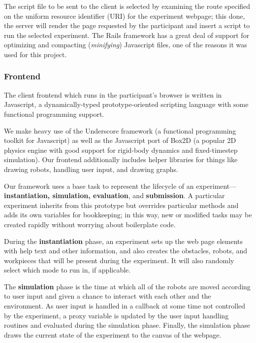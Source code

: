 The script file to be sent to the client is selected by examining the route specified on the  uniform resource identifier (URI) for the experiment webpage; this done, the server will render the page requested by the participant and insert a script to run the selected experiment. The Rails framework has a great deal of support for optimizing and compacting (\emph{minifying}) Javascript files, one of the reasons it was used for this project.

\subsubsection{Frontend}

The client frontend which runs in the participant's browser is written in Javascript, a dynamically-typed prototype-oriented scripting language with some functional programming support.

We make heavy use of the Underscore framework (a functional programming toolkit for Javascript) as well as the Javascript port of Box2D (a popular 2D physics engine with good support for rigid-body dynamics and fixed-timestep simulation). Our frontend additionally includes helper libraries for things like drawing robots, handling user input, and drawing graphs.

Our framework uses a base task to represent the lifecycle of an experiment---{\bf  instantiation, simulation, evaluation}, and {\bf submission}. A particular experiment inherits from this prototype but overrides particular methods and adds its own variables for bookkeeping; in this way, new or modified tasks may be created rapidly without worrying about boilerplate code.

During the {\bf instantiation} phase, an experiment sets up the web page elements with help text and other information, and also creates the obstacles, robots, and workpieces that will be present during the experiment. It will also randomly select which mode to run in, if applicable.

The {\bf simulation} phase is the time at which all of the robots are moved according to user input and given a chance to interact with each other and the environment. As user input is handled in a callback at some time not controlled by the experiment, a proxy variable is updated by the user input handling routines and evaluated during the simulation phase. Finally, the simulation phase draws the current state of the experiment to the canvas of the webpage.

